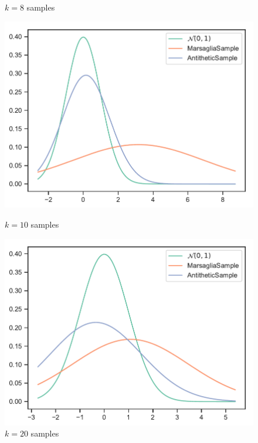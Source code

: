 \documentclass[12pt, a4paper]{article}
\begin{document}
\begin{figure}[H]
\centering
    \begin{minipage}{.49\textwidth}
        \centering
        \caption{$k = 8$ samples}
        \includegraphics[scale=0.6]{../figures/normal-k8.pdf}
    \end{minipage}
    \begin{minipage}{.49\textwidth}
        \centering
        \caption{$k = 10$ samples}
        \includegraphics[scale=0.6]{../figures/normal-k10.pdf}
    \end{minipage}
    \begin{minipage}{\textwidth}
        \centering
        \caption{$k = 20$ samples}

\end{minipage}
\end{figure}
\end{document}
